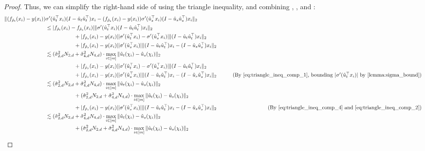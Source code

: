 \begin{proof}
Thus, we can simplify the right-hand side of  using the triangle inequality, and combining , ,  and :
\begin{align}
\|(f_{\rhohat_t}(x_i) - y(x_i)) & \sigma'(\uhat_t^\top x_i) (I - \uhat_t \uhat_t^\top) x_i - (f_{\rhohat_s}(x_i) - y(x_i)) \sigma'(\uhat_s^\top x_i) (I - \uhat_s \uhat_s^\top) x_i \|_2 \\
& \leq |f_{\rhohat_t}(x_i) - f_{\rhohat_s}(x_i)| \|\sigma'(\uhat_t^\top x_i) (I - \uhat_t \uhat_t^\top) x_i\|_2 \\
& \nextlinespace\nextlinespace + |f_{\rhohat_s}(x_i) - y(x_i)| |\sigma'(\uhat_t^\top x_i) - \sigma'(\uhat_s^\top x_i)| \|(I - \uhat_t \uhat_t^\top)x_i \|_2 \\
& \nextlinespace\nextlinespace + |f_{\rhohat_s}(x_i) - y(x_i)||\sigma'(\uhat_s^\top x_i)| \|(I - \uhat_t \uhat_t^\top)x_i - (I - \uhat_s \uhat_s^\top) x_i\|_2 \\
& \lesssim (\sigmaCoeffTwo^2 N_{2, d} + \sigmaCoeffFour^2 N_{4, d}) \cdot \max_{i \in [m]} \|\uhat_t(\chi_i) - \uhat_s(\chi_i)\|_2 \\
& \nextlinespace\nextlinespace + |f_{\rhohat_s}(x_i) - y(x_i)| |\sigma'(\uhat_t^\top x_i) - \sigma'(\uhat_s^\top x_i)| \|(I - \uhat_t \uhat_t^\top)x_i \|_2 \\
& \nextlinespace\nextlinespace + |f_{\rhohat_s}(x_i) - y(x_i)||\sigma'(\uhat_s^\top x_i)| \|(I - \uhat_t \uhat_t^\top)x_i - (I - \uhat_s \uhat_s^\top) x_i\|_2 
& \tag{By \Cref{eq:triangle_ineq_comp_1}, bounding $|\sigma'(\uhat_t^\top x_i)|$ by \Cref{lemma:sigma_bound}} \\
& \lesssim (\sigmaCoeffTwo^2 N_{2, d} + \sigmaCoeffFour^2 N_{4, d}) \cdot \max_{i \in [m]} \|\uhat_t(\chi_i) - \uhat_s(\chi_i)\|_2 \\
& \nextlinespace\nextlinespace + (\sigmaCoeffTwo^2 N_{2, d} + \sigmaCoeffFour^2 N_{4, d}) \cdot \max_{i \in [m]} \|\uhat_t(\chi_i) - \uhat_s(\chi_i)\|_2 \\
& \nextlinespace\nextlinespace + |f_{\rhohat_s}(x_i) - y(x_i)||\sigma'(\uhat_s^\top x_i)| \|(I - \uhat_t \uhat_t^\top)x_i - (I - \uhat_s \uhat_s^\top) x_i\|_2 
& \tag{By \Cref{eq:triangle_ineq_comp_4} and \Cref{eq:triangle_ineq_comp_2}} \\
& \lesssim (\sigmaCoeffTwo^2 N_{2, d} + \sigmaCoeffFour^2 N_{4, d}) \cdot \max_{i \in [m]} \|\uhat_t(\chi_i) - \uhat_s(\chi_i)\|_2 \\
& \nextlinespace\nextlinespace + (\sigmaCoeffTwo^2 N_{2, d} + \sigmaCoeffFour^2 N_{4, d}) \cdot \max_{i \in [m]} \|\uhat_t(\chi_i) - \uhat_s(\chi_i)\|_2 \\

\end{align}
\end{proof}
